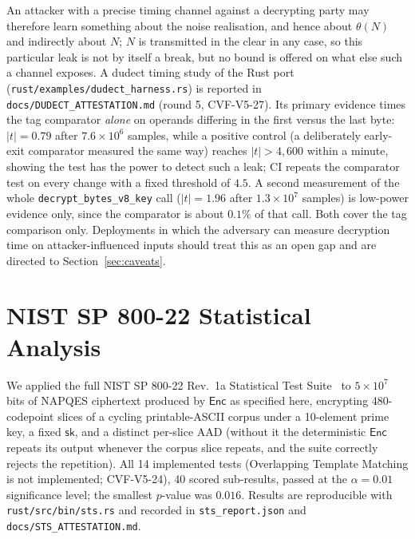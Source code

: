 \documentclass[11pt,a4paper]{article}
\begin{document}
An attacker with a precise timing channel against a decrypting party may
therefore learn something about the noise realisation, and hence about
$\theta(N)$ and indirectly about $N$; $N$ is transmitted in the clear in
any case, so this particular leak is not by itself a break, but no bound is
offered on what else such a channel exposes. A dudect timing study of the
Rust port (\texttt{rust/examples/dudect\_harness.rs}) is reported in
\texttt{docs/DUDECT\_ATTESTATION.md} (round 5, CVF-V5-27). Its primary
evidence times the tag comparator \emph{alone} on operands differing in the
first versus the last byte: $|t|=0.79$ after $7.6\times10^{6}$ samples, while
a positive control (a deliberately early-exit comparator measured the same
way) reaches $|t|>4{,}600$ within a minute, showing the test has the power
to detect such a leak; CI repeats the comparator test on every change with a
fixed threshold of $4.5$. A second measurement of the whole
\texttt{decrypt\_bytes\_v8\_key} call ($|t|=1.96$ after $1.3\times10^{7}$
samples) is low-power evidence only, since the comparator is about $0.1\%$
of that call. Both cover the tag comparison only. Deployments in which the adversary can measure
decryption time on attacker-influenced inputs should treat this as an open
gap and are directed to Section~\ref{sec:caveats}.

\section{NIST SP 800-22 Statistical Analysis}
\label{sec:sts}

We applied the full NIST SP 800-22 Rev.\ 1a Statistical Test
Suite~\cite{sp800-22} to $5\times10^7$ bits of NAPQES ciphertext produced by
$\mathsf{Enc}$ as specified here, encrypting 480-codepoint slices of a
cycling printable-ASCII corpus under a 10-element prime key, a fixed
$\mathsf{sk}$, and a distinct per-slice AAD (without it the deterministic
$\mathsf{Enc}$ repeats its output whenever the corpus slice repeats, and the
suite correctly rejects the repetition). All 14 implemented tests (Overlapping Template Matching is not
implemented; CVF-V5-24), 40 scored
sub-results, passed at the $\alpha=0.01$ significance level; the smallest
$p$-value was $0.016$. Results are reproducible with
\texttt{rust/src/bin/sts.rs} and recorded in \texttt{sts\_report.json} and
\texttt{docs/STS\_ATTESTATION.md}.
\end{document}
